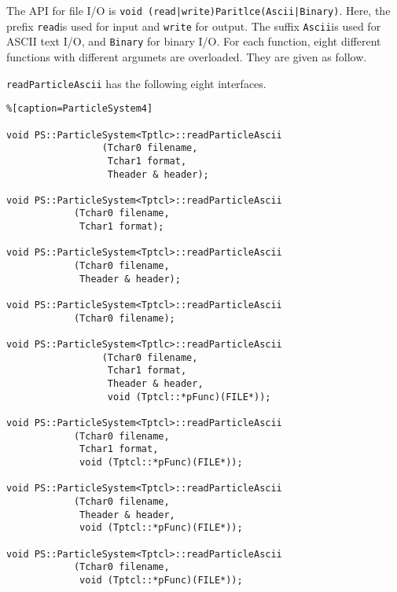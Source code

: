 The API for file I/O is {\tt void (read|write)Paritlce(Ascii|Binary)}.
Here, the prefix {\tt read}is used for input and  {\tt write} for
output.
The suffix {\tt Ascii}is used for ASCII text I/O, and {\tt Binary} for
binary I/O. For each function, eight different functions with
different argumets are overloaded. They are given as follow.



\label{sec:readParticleAscii}

\texttt{readParticleAscii} has the following eight interfaces.
\begin{lstlisting}%[caption=ParticleSystem4]

void PS::ParticleSystem<Tptlc>::readParticleAscii
                 (Tchar0 filename,
                  Tchar1 format,
                  Theader & header);
                  
void PS::ParticleSystem<Tptcl>::readParticleAscii
            (Tchar0 filename,
             Tchar1 format);
             
void PS::ParticleSystem<Tptcl>::readParticleAscii
            (Tchar0 filename,
             Theader & header);
             
void PS::ParticleSystem<Tptcl>::readParticleAscii
            (Tchar0 filename);
            
void PS::ParticleSystem<Tptlc>::readParticleAscii
                 (Tchar0 filename,
                  Tchar1 format,
                  Theader & header,
                  void (Tptcl::*pFunc)(FILE*));
                  
void PS::ParticleSystem<Tptcl>::readParticleAscii
            (Tchar0 filename,
             Tchar1 format,
             void (Tptcl::*pFunc)(FILE*));
             
void PS::ParticleSystem<Tptcl>::readParticleAscii
            (Tchar0 filename,
             Theader & header,
             void (Tptcl::*pFunc)(FILE*));
             
void PS::ParticleSystem<Tptcl>::readParticleAscii
            (Tchar0 filename,
             void (Tptcl::*pFunc)(FILE*));
\end{lstlisting}

